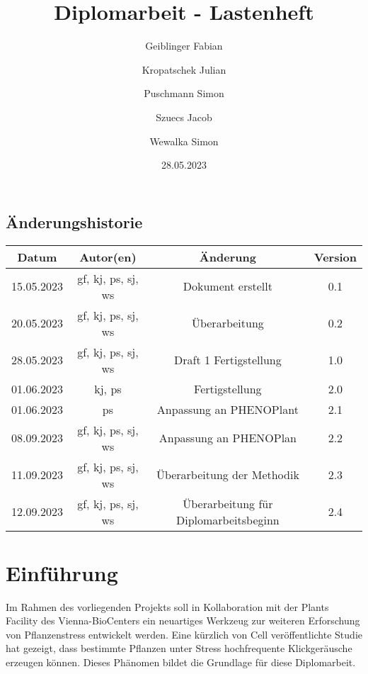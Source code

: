 \documentclass[12pt]{article}
\title{Diplomarbeit - Lastenheft}
\author{
  Geiblinger Fabian
  \and Kropatschek Julian
  \and Puschmann Simon
  \and Szuecs Jacob
  \and Wewalka Simon
}
\date{28.05.2023}
\begin{document}
\maketitle

\vspace*{\fill}



\begin{center}
    \section*{Änderungshistorie}
    \begin{tabular}{|c|c|c|c|}
    \hline
  \centering
  Datum & Autor(en) & Änderung & Version \\
  \hline
  15.05.2023 & \acrshort{gf}, \acrshort{kj}, \acrshort{ps}, \acrshort{sj}, \acrshort{ws} & Dokument erstellt & 0.1 \\
  20.05.2023 & \acrshort{gf}, \acrshort{kj}, \acrshort{ps}, \acrshort{sj}, \acrshort{ws} & Überarbeitung & 0.2 \\
  28.05.2023 & \acrshort{gf}, \acrshort{kj}, \acrshort{ps}, \acrshort{sj}, \acrshort{ws} & Draft 1 Fertigstellung & 1.0\\
  01.06.2023 & \acrshort{kj}, \acrshort{ps} & Fertigstellung & 2.0\\
  01.06.2023 & \acrshort{ps} & Anpassung an PHENOPlant & 2.1\\
  08.09.2023 & \acrshort{gf}, \acrshort{kj}, \acrshort{ps}, \acrshort{sj}, \acrshort{ws} & Anpassung an PHENOPlan & 2.2\\
  11.09.2023 & \acrshort{gf}, \acrshort{kj}, \acrshort{ps}, \acrshort{sj}, \acrshort{ws} & Überarbeitung der Methodik & 2.3\\
  12.09.2023 & \acrshort{gf}, \acrshort{kj}, \acrshort{ps}, \acrshort{sj}, \acrshort{ws} & Überarbeitung für Diplomarbeitsbeginn & 2.4\\
  \hline
\end{tabular}
\end{center}


\clearpage

\tableofcontents
\clearpage




\section{Einführung}
     Im Rahmen des vorliegenden Projekts soll in Kollaboration mit der Plants Facility des Vienna-BioCenters ein neuartiges Werkzeug zur weiteren Erforschung von Pflanzenstress entwickelt werden. Eine kürzlich von Cell veröffentlichte \Gls{Studie} hat gezeigt, dass bestimmte Pflanzen unter Stress hochfrequente Klickgeräusche erzeugen können. Dieses Phänomen bildet die Grundlage für diese Diplomarbeit.
\end{document}
